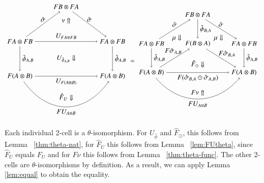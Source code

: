 \begin{equation}
\begin{aligned}
\begin{tikzpicture}[xscale=1.2, yscale=1.8]
\node (t) at (2,3) {$FB \otimes FA$};
\node (tl) at (0,2) {$FA \otimes FB$};
\node (bl) at (0,1) {$F(A\otimes B)$};
\node (tr) at (4,2) {$FA \otimes FB$};
\node (br) at (4,1) {$F(A\otimes B)$};
\draw[->] (t) to node [above] {$\hat{\sigma}$} (tr);
\draw[->] (tr) to node [right] {$\hat{\phi}_{A,B}$} (br);
\draw[->] (tl) to node [above] {$\hat{\sigma}$} (t);
\draw[->] (tl) to node [right] {$\hat{\phi}_{A,B}$} (bl);
\draw[->] (tl) to node [above] {$U_{FA \otimes FB}$} (tr);
\draw[->] (bl) to[in=-135, out=-45] node [below] {$FU_{A\otimes B}$} (br);
\draw[->] (bl) to node [below] {$U_{F(A \otimes B)}$} (br);
\node at (2,2.6) {$\nu \Uparrow$};
\node at (2,1.5) {$U_{\hat{\phi}_{A,B}} \Downarrow$};
\node at (2, 0.4) {$\hat{F}_U \Downarrow$};
\end{tikzpicture}
\end{aligned}
=
\begin{aligned}
\begin{tikzpicture}[xscale=1.2, yscale=1.5]
\node (t) at (2,3) {$FB \otimes FA$};
\node (tl) at (0,2) {$FA \otimes FB$};
\node (bl) at (0,1) {$F(A\otimes B)$};
\node (m) at (2,2) {$F(B\otimes A)$};
\node (tr) at (4,2) {$FA \otimes FB$};
\node (br) at (4,1) {$F(A\otimes B)$};
\draw[->] (t) to node [above] {$\hat{\sigma}$} (tr);
\draw[->] (t) to node [right] {$\hat{\phi}_{B,A}$} (m);
\draw[->] (tr) to node [right] {$\hat{\phi}_{A,B}$} (br);
\draw[->] (tl) to node [above] {$\hat{\sigma}$} (t);
\draw[->] (tl) to node [right] {$\hat{\phi}_{A,B}$} (bl);
\draw[->] (bl) to node [left,yshift=10pt, xshift=14pt] {$F\hat{\sigma}_{A,B}$} (m);
\draw[->] (m) to node [right,xshift=-7,yshift=6] {$F{\hat{\sigma}}_{B,A}$} (br);
\draw[->] (bl) to[in=-135, out=-45] node [below] {$FU_{A\otimes B}$} (br);
\draw[->] (bl) to node [below] {$F({\hat{\sigma}}_{B,A} \odot {\hat{\sigma}}_{A, B})$} (br);
\node at (1.1,2.2) {$\mu \Downarrow$};
\node at (2.9,2.2) {$\mu \Downarrow$};
\node at (2,1.3) {$ \hat{F}_{\odot} \Downarrow$};
\node at (2, 0.3) {$F\nu \Uparrow$};
\end{tikzpicture}
\end{aligned}
\end{equation} 

Each individual 2-cell is a $\theta$-isomorphism. For $U_{\hat{\phi}}$ and $\hat{F}_{\odot}$, 
this follows from Lemma ~\ref{thm:theta-nat}, for $\hat{F}_{U}$ this follows from Lemma ~\ref{lem:FUtheta}, since $\hat{F}_{U}$ equals $F_U$ and for $F \nu$ this follows from Lemma ~\ref{thm:theta-func}. The other 2-cells are $\theta$-isomorphisms by definition.
As a result, we can apply Lemma \ref{lem:equal} to obtain the equality.  


